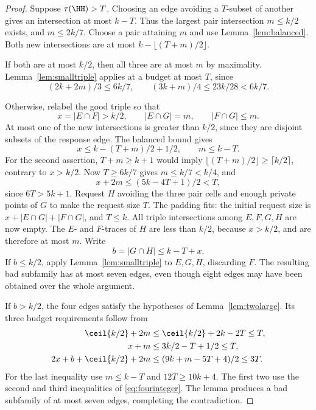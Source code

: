 \begin{proof}
Suppose $\tau(\HH)>T$. Choosing an edge avoiding a $T$-subset of
another gives an intersection at most $k-T$. Thus the largest pair
intersection $m\le k/2$ exists, and $m\le2k/7$. Choose a pair attaining
$m$ and use Lemma~\ref{lem:balanced}. Both new intersections are at most
$k-\lfloor(T+m)/2\rfloor$.

If both are at most $k/2$, then all three are at most $m$ by maximality.
Lemma~\ref{lem:smalltriple} applies at a budget at most $T$, since
\[
 (2k+2m)/3\le6k/7,\qquad (3k+m)/4\le23k/28<6k/7.
\]

Otherwise, relabel the good triple so that
\[
 x=|E\cap F|>k/2,\qquad |E\cap G|=m,\qquad |F\cap G|\le m.
\]
At most one of the new intersections is greater than $k/2$, since they
are disjoint subsets of the response edge. The balanced bound gives
\begin{equation}\label{eq:smallmaxbounds}
 x\le k-(T+m)/2+1/2,\qquad m\le k-T.
\end{equation}
For the second assertion, $T+m\ge k+1$ would imply
$\lfloor(T+m)/2\rfloor\ge\lceil k/2\rceil$, contrary to $x>k/2$.
Now $T\ge6k/7$ gives $m\le k/7<k/4$, and
\[
 x+2m\le(5k-4T+1)/2<T,
\]
since $6T>5k+1$. Request $H$ avoiding the three pair cells and enough
private points of $G$ to make the request size $T$. The padding fits:
the initial request size is $x+|E\cap G|+|F\cap G|$, and $T\le k$.
All triple intersections among $E,F,G,H$ are now empty. The $E$- and
$F$-traces of $H$ are less than $k/2$, because $x>k/2$, and are
therefore at most $m$. Write
\[
 b=|G\cap H|\le k-T+x.
\]
If $b\le k/2$, apply Lemma~\ref{lem:smalltriple} to $E,G,H$,
discarding $F$. The resulting bad subfamily has at most seven edges,
even though eight edges may have been obtained over the whole argument.

If $b>k/2$, the four edges satisfy the hypotheses of
Lemma~\ref{lem:twolarge}. Its three budget requirements follow from
\begin{align*}
 \ceil{k/2}+2m
   &\le\ceil{k/2}+2k-2T\le T,\\
 x+m&\le3k/2-T+1/2\le T,\\
 2x+b+\ceil{k/2}+2m
   &\le(9k+m-5T+4)/2\le3T.
\end{align*}
For the last inequality use $m\le k-T$ and $12T\ge10k+4$.
The first two use the second and third inequalities of
\eqref{eq:fourinteger}. The lemma produces a bad subfamily of at most seven
edges, completing the contradiction.
\end{proof}
